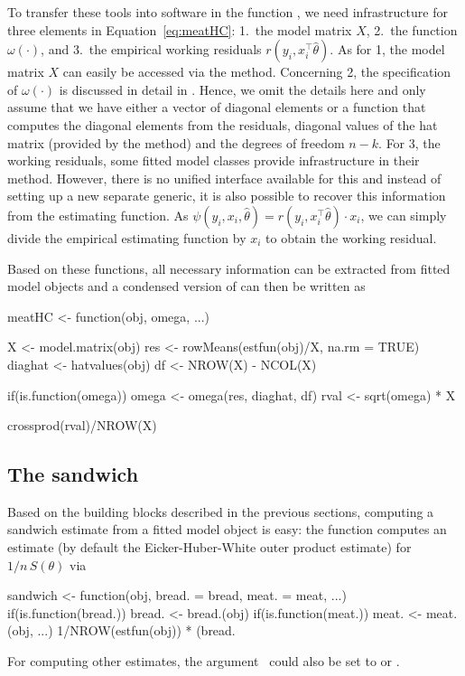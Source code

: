 \documentclass{Z}
\begin{document}
To transfer these tools into software in the function , we need infrastructure
for three elements in Equation~\ref{eq:meatHC}: 1.~the model matrix $X$, 2.~the function $\omega(\cdot)$,
and 3.~the empirical working residuals $r(y_i, x_i^\top \hat \theta)$. As for 1, the model matrix $X$ can
easily be accessed via the  method. Concerning 2, the specification of $\omega(\cdot)$
is discussed in detail in \cite{hac:Zeileis:2004a}. Hence, we omit the details here and only assume
that we have either a vector  of diagonal elements or a function  that
computes the diagonal elements from the residuals, diagonal values of the hat matrix (provided
by the  method) and the degrees of freedom $n-k$.
For 3, the working residuals, some fitted model classes provide infrastructure in their 
method. However, there is no unified interface available for this and instead of setting up
a new separate generic, it is also possible to recover this information from the estimating function.
As $\psi(y_i, x_i, \hat \theta) = r(y_i, x_i^\top \hat \theta) \cdot x_i$, we can simply 
divide the empirical estimating function by $x_i$ to obtain the working residual.

Based on these functions, all necessary information can be extracted from fitted model
objects and a condensed version of  can then be written as
\begin{Schunk}
\begin{Sinput}
meatHC <- function(obj, omega, ...)
{
  X <- model.matrix(obj)
  res <- rowMeans(estfun(obj)/X, na.rm = TRUE)
  diaghat <- hatvalues(obj)
  df <- NROW(X) - NCOL(X)  
  
  if(is.function(omega)) omega <- omega(res, diaghat, df)
  rval <- sqrt(omega) * X
  
  crossprod(rval)/NROW(X)
}
\end{Sinput}
\end{Schunk}

\subsection{The sandwich}

Based on the building blocks described in the previous sections, computing a
sandwich estimate from a fitted model object is easy: the
function  computes an estimate (by default the Eicker-Huber-White
outer product estimate) for $1/n \, S(\theta)$ via
\begin{Schunk}
\begin{Sinput}
sandwich <- function(obj, bread. = bread, meat. = meat, ...)
{
  if(is.function(bread.)) bread. <- bread.(obj)
  if(is.function(meat.)) meat. <- meat.(obj, ...)
  1/NROW(estfun(obj)) * (bread. %*% meat. %*% bread.)
}
\end{Sinput}
\end{Schunk}
For computing other estimates, the argument ~could also be set to
 or . 
\end{document}
